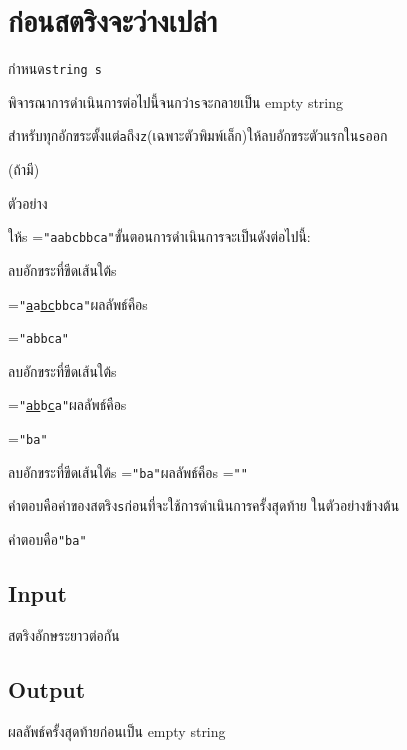 \documentclass{article}
\begin{document}
\section*{ก่อนสตริงจะว่างเปล่า}

กำหนด\texttt{string\ s}



พิจารณาการดำเนินการต่อไปนี้จนกว่า\texttt{s}จะกลายเป็น empty string



สำหรับทุกอักขระตั้งแต่\texttt{\textquotesingle{}a\textquotesingle{}}ถึง\texttt{\textquotesingle{}z\textquotesingle{}}(เฉพาะตัวพิมพ์เล็ก)ให้ลบอักขระตัวแรกใน\texttt{s}ออก

(ถ้ามี)



\hfill\break



ตัวอย่าง



ให้s =\texttt{"aabcbbca"}ขั้นตอนการดำเนินการจะเป็นดังต่อไปนี้:



ลบอักขระที่ขีดเส้นใต้s

=\texttt{"}\ul{\mbox{\texttt{a}}}\texttt{a}\ul{\mbox{\texttt{bc}}}\texttt{bbca"}ผลลัพธ์คือs

=\texttt{"abbca"}



ลบอักขระที่ขีดเส้นใต้s

=\texttt{"}\ul{\mbox{\texttt{ab}}}\texttt{b}\ul{\mbox{\texttt{c}}}\texttt{a"}ผลลัพธ์คือs

=\texttt{"ba"}



ลบอักขระที่ขีดเส้นใต้s =\texttt{"ba"}ผลลัพธ์คือs =\texttt{""}



คำตอบคือค่าของสตริง\texttt{s}ก่อนที่จะใช้การดำเนินการครั้งสุดท้าย ในตัวอย่างข้างต้น

คำตอบคือ\texttt{"ba"}



\subsection*{Input}
สตริงอักษระยาวต่อกัน



\subsection*{Output}
ผลลัพธ์ครั้งสุดท้ายก่อนเป็น empty string
\end{document}
